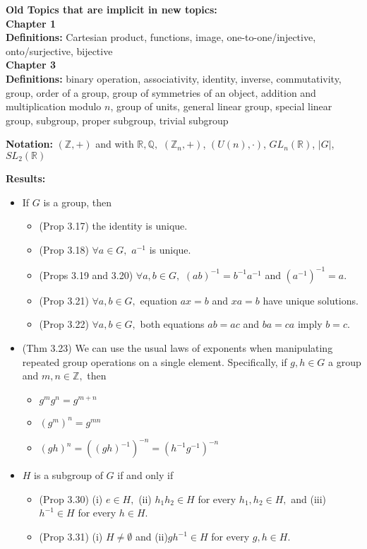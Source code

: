 \documentclass[12pt]{article}
\newcommand{\bbZ}{\mathbb{Z}}
\newcommand{\bbR}{\mathbb{R}}
\newcommand{\bbQ}{\mathbb{Q}}
\begin{document}
\textbf{Old Topics that are implicit in new topics:}\\

\noindent \textbf{Chapter 1}\\

\textbf{Definitions:} Cartesian product, functions, image, one-to-one/injective, onto/surjective, bijective\\

\noindent \textbf{Chapter 3}\\

\textbf{Definitions:} binary operation, associativity, identity, inverse, commutativity, group, order of a group, group of symmetries of an object, addition and multiplication modulo $n$, group of units, general linear group, special linear group, subgroup, proper subgroup, trivial subgroup

\textbf{Notation:} $(\bbZ,+)$ and with $\bbR,\bbQ,$  $(\bbZ_n,+)$, $(U(n), \cdot )$, $GL_n(\bbR)$, $|G|$, $SL_2(\bbR)$

\textbf{Results:}
\begin{itemize}
	\item If $G$ is a group, then
		\begin{itemize}
		\item (Prop 3.17) the identity is unique.
		\item (Prop 3.18) $\forall a \in G,$ $a^{-1}$ is unique.
		\item (Props 3.19 and 3.20) $\forall a,b \in G,$ $(ab)^{-1}=b^{-1}a^{-1}$ and $(a^{-1})^{-1}=a.$
		\item (Prop 3.21) $\forall a,b \in G,$ equation $ax=b$ and $xa=b$ have unique solutions.
		\item (Prop 3.22) $\forall a,b \in G,$ both equations $ab=ac$ and $ba=ca$ imply $b=c.$
		\end{itemize}
	\item (Thm 3.23) We can use the usual laws of exponents when manipulating repeated group operations on a single element. Specifically, if $g,h \in G$ a group and $m,n \in \bbZ,$ then
		\begin{itemize}
		\item $g^mg^n=g^{m+n}$
		\item $(g^m)^n=g^{mn}$
		\item $(gh)^n=((gh)^{-1})^{-n}=(h^{-1}g^{-1})^{-n}$
		\end{itemize}
	\item $H$ is a subgroup of $G$ if and only if
		\begin{itemize}
		\item (Prop 3.30) (i) $e \in H,$ (ii) $h_1h_2 \in H$ for every $h_1,h_2 \in H,$ and (iii) $h^{-1} \in H$ for every $h \in H.$
		\item (Prop 3.31) (i) $H \not= \emptyset$ and (ii)$gh^{-1} \in H$ for every $g,h \in H.$
		\end{itemize}
\end{itemize}
\end{document}
